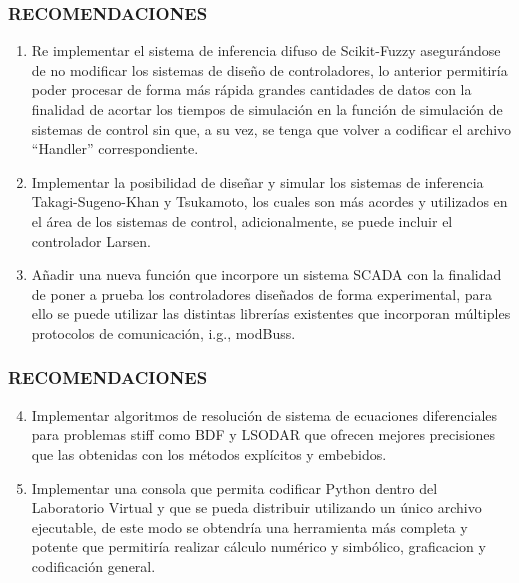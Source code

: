\documentclass[usenames,xcolor={dvipsnames, table}]{beamer}
\begin{document}
\begin{frame}
	\frametitle{RECOMENDACIONES}
	\small
	\vspace{20pt}
	\begin{enumerate}   
		\item Re implementar el sistema de inferencia difuso de Scikit-Fuzzy asegurándose de no modificar los sistemas de diseño de controladores, lo anterior permitiría poder procesar de forma más rápida grandes cantidades de datos con la finalidad de acortar los tiempos de simulación en la función de simulación de sistemas de control sin que, a su vez, se tenga que volver a codificar el archivo ``Handler'' correspondiente.
		
		\item Implementar la posibilidad de diseñar y simular los sistemas de inferencia Takagi-Sugeno-Khan y Tsukamoto, los cuales son más acordes y utilizados en el área de los sistemas de control, adicionalmente, se puede incluir el controlador Larsen.
		
		\item Añadir una nueva función que incorpore un sistema SCADA con la finalidad de poner a prueba los controladores diseñados de forma experimental, para ello se puede utilizar las distintas librerías existentes que incorporan múltiples protocolos de comunicación, i.g., modBuss.
		
	\end{enumerate}

\end{frame}

\begin{frame}
	\frametitle{RECOMENDACIONES}
	\vspace{15pt}
	\small
	\begin{enumerate}
		\setcounter{enumi}{3}
		\setlength\itemsep{1em} 
		\item Implementar algoritmos de resolución de sistema de ecuaciones diferenciales para problemas stiff como BDF y LSODAR que ofrecen mejores precisiones que las obtenidas con los métodos explícitos y embebidos.
		
		\item Implementar una consola que permita codificar Python dentro del Laboratorio Virtual y que se pueda distribuir utilizando un único archivo ejecutable, de este modo se obtendría una herramienta más completa y potente que permitiría realizar cálculo numérico y simbólico, graficacion y codificación general.
	\end{enumerate}
	

\end{frame}
\end{document}
